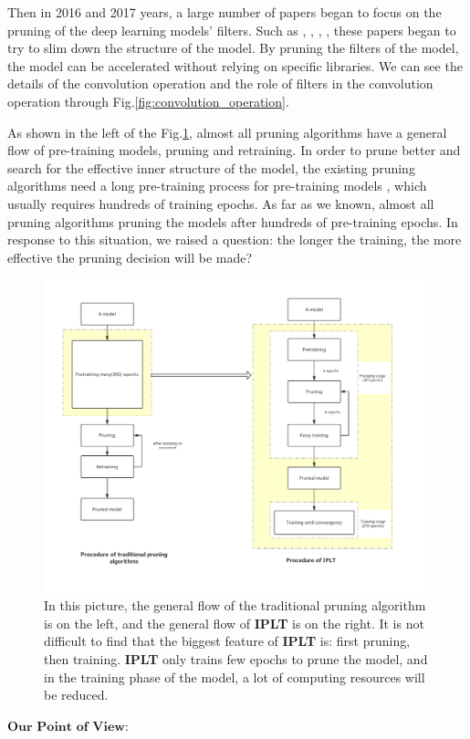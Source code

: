 \documentclass[runningheads]{llncs}
\begin{document}
Then in 2016 and 2017 years, a large number of papers began to focus on the pruning of the deep learning models' filters. Such as \cite{b19}, \cite{b20}, \cite{b21}, \cite{b22}, these papers began to try to slim down the structure of the model. By pruning the filters of the model, the model can be accelerated without relying on specific libraries. We can see the details of the convolution operation and the role of filters in the convolution operation through Fig.\ref{fig:convolution_operation}.

As shown in the left of the Fig.\ref{fig:pruning_contrast}, almost all pruning algorithms have a general flow of pre-training models, pruning and retraining.  In order to prune better and search for the effective inner structure of the model, the existing pruning algorithms need a long pre-training process for pre-training models , which usually requires hundreds of training epochs. As far as we known, almost all pruning algorithms pruning the models after hundreds of pre-training epochs. In response to this situation, we raised a question: the longer the training, the more effective the pruning decision will be made?

\begin{figure}
\centering
\includegraphics[width=.5\textwidth]{pruning_contrast.pdf}
\caption{In this picture, the general flow of the traditional pruning algorithm is on the left, and the general flow of \textbf{IPLT} is on the right. It is not difficult to find that the biggest feature of \textbf{IPLT} is: first pruning, then training. \textbf{IPLT} only trains few epochs to prune the model, and in the training phase of the model, a lot of computing resources will be reduced.}
\label{fig:pruning_contrast}
\end{figure}

$\textbf{Our Point of View:}$
\end{document}
